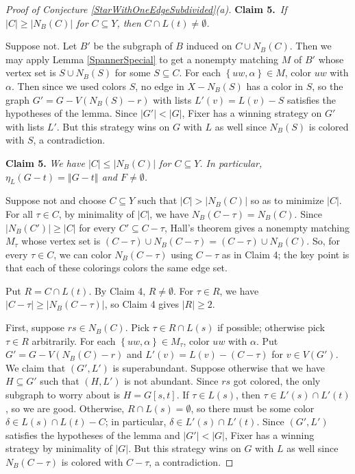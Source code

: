 \documentclass[12pt]{article}
\theoremstyle{plain}
\theoremstyle{definition}
\theoremstyle{remark}
\newcommand{\set}[1]{\left\{ #1 \right\}}
\newcommand{\card}[1]{\left|#1\right|}
\newcommand{\size}[1]{\left\Vert#1\right\Vert}
\newcommand{\claim}[2]{{\bf Claim #1.}~{\it #2}~~}
\begin{document}
\begin{proof} [Proof of Conjecture \ref{StarWithOneEdgeSubdivided}(a)]
	\claim{5}{If $\card{C} \ge \card{N_B(C)}$ for $C \subseteq Y$, then $C \cap L(t) \ne \emptyset$.}
	
	Suppose not. Let $B'$ be the subgraph of $B$ induced on $C \cup N_B(C)$. Then we may apply Lemma \ref{SpannerSpecial} to get a nonempty matching $M$ of $B'$ whose vertex set is $S \cup N_B(S)$ for some $S \subseteq C$.  For each $\set{uw, \alpha} \in M$, color $uw$ with $\alpha$.  Then since we used colors $S$, no edge in $X - N_B(S)$ has a color in $S$, so the graph $G' = G - V(N_B(S) - r)$ with lists $L'(v) = L(v) - S$ satisfies the hypotheses of the lemma.  Since $\card{G'} < \card{G}$, Fixer has a winning strategy on $G'$ with lists $L'$.  But this strategy wins on $G$ with $L$ as well since $N_B(S)$ is colored with $S$, a contradiction. 
	
	\noindent\textbf{Claim 5.  }\textit{We have $\card{C} \le \card{N_B(C)}$ for $C \subseteq Y$. In particular, $\eta_L(G-t) = \size{G-t}$ and $F \ne \emptyset$.}
	
	Suppose not and choose $C \subseteq Y$ such that $\card{C} > \card{N_B(C)}$ so as to minimize $\card{C}$.  For all $\tau \in C$, by minimality of $\card{C}$, we have $N_B(C - \tau) = N_B(C)$.  Since $\card{N_B(C')} \ge \card{C}$ for every $C' \subseteq C - \tau$, Hall's theorem gives a nonempty matching $M_\tau$ whose vertex set is $(C - \tau) \cup N_B(C-\tau) = (C - \tau) \cup N_B(C)$.  So, for every $\tau \in C$, we can color $N_B(C - \tau)$ using $C - \tau$ as in Claim 4; the key point is that each of these colorings colors the same edge set.
	
	Put $R = C \cap L(t)$.  By Claim 4, $R \ne \emptyset$.  For $\tau \in R$, we have $\card{C - \tau} \ge \card{N_B(C - \tau)}$, so Claim 4 gives $\card{R} \ge 2$. 
	
	First, suppose $rs \in N_B(C)$. Pick $\tau \in R \cap L(s)$ if possible; otherwise pick $\tau \in R$ arbitrarily. For each $\set{uw, \alpha} \in M_\tau$, color $uw$ with $\alpha$.  Put $G' = G - V(N_B(C) - r)$ and $L'(v) = L(v) - (C - \tau)$ for $v \in V(G')$.  We claim that $(G', L')$ is superabundant.  Suppose otherwise that we have $H \subseteq G'$ such that $(H, L')$ is not abundant.  Since $rs$ got colored, the only subgraph to worry about is $H = G[s,t]$.  If $\tau \in L(s)$, then $\tau \in L'(s) \cap L'(t)$, so we are good.  Otherwise, $R \cap L(s) = \emptyset$, so there must be some color $\delta \in L(s) \cap L(t) - C$; in particular, $\delta \in L'(s) \cap L'(t)$.  Since $(G', L')$ satisfies the hypotheses of the lemma and $\card{G'} < \card{G}$, Fixer has a winning strategy by minimality of $\card{G}$.  But this strategy wins on $G$ with $L$ as well since $N_B(C - \tau)$ is colored with $C - \tau$, a contradiction. 
	

\end{proof}
\end{document}
